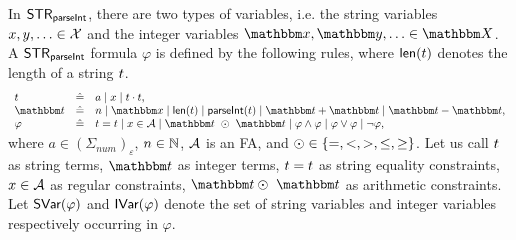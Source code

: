 In ${\sf STR}_{\textsf{parseInt}}$, there are two types of variables, i.e. the string variables $x,y,\ldots \in \mathcal{X}$ and the integer variables $\ivarx,\ivary,\ldots \in \ivars$.
%
A ${\sf STR}_{\textsf{parseInt}}$ formula $\varphi$ is defined by the following rules, where $\textsf{len}(t)$ denotes the length of a string $t$.
\vspace{-2mm}
\[
\begin{array}{l c l}
\sterm & \Def & a \mid \svarx \mid \sterm \concat \sterm, \\
\iterm & \Def & n \mid \ivarx \mid \len(\sterm) \mid \parseInt(\sterm) \mid \iterm + \iterm \mid \iterm - \iterm,\\
\vspace{-2mm}
\varphi & \Def & \sterm = \sterm \mid x \in \Aut \mid \iterm\ \op\ \iterm \mid \varphi \wedge \varphi \mid \varphi \vee \varphi \mid \neg \varphi,
\end{array}
\]
where $a \in (\Sigma_{\textit{num}})_\varepsilon$, $n \in \mathbb{N}$, $\mathcal{A}$ is an FA, and $\odot \in \{=, < , >, \le, \ge\}$. Let us call $t$ as string terms, $\iterm$ as integer terms, $t = t$ as string equality constraints, $x \in \mathcal{A}$ as regular constraints, $\iterm \op\ \iterm$ as arithmetic constraints. 
Let  $\textsf{SVar}(\varphi)$ and $\textsf{IVar}(\varphi)$ denote the set of string variables and integer variables respectively occurring in $\varphi$.


